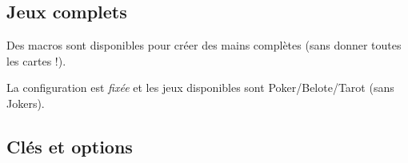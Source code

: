 \documentclass[a4paper]{article}
\newcommand\cmaj[1]{\tcbox[vignetteMaJ]{#1}\xspace}
\begin{document}
\begin{codetex}
\end{codetex}

\subsection{Jeux complets}

\begin{codeidee}
\cmaj{0.3.0} Des macros sont disponibles pour créer des mains complètes (sans donner toutes les cartes !).

La configuration est \textit{fixée} et les jeux disponibles sont  \textsf{Poker/Belote/Tarot} (sans \textsf{Jokers}).
\end{codeidee}

\begin{codetex}
\JeuCompletBeloteTriCoul
\JeuCompletBeloteTriHaut

\JeuCompletPokerTriCoul
\JeuCompletPokerTriCoulJok
\JeuCompletPokerTriHaut
\JeuCompletPokerTriHautJok

\JeuCompletTarotTriCoul
\JeuCompletTarotTriHaut
\end{codetex}

\subsection{Clés et options}
\end{document}
